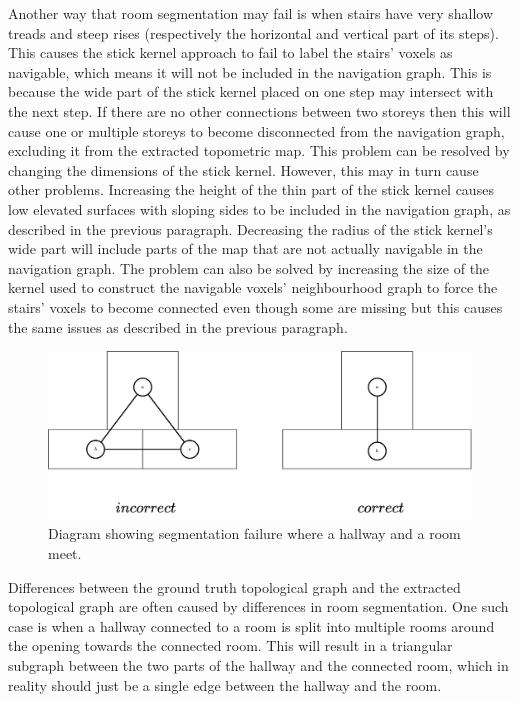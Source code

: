 Another way that room segmentation may fail is when stairs have very shallow treads and steep rises (respectively the horizontal and vertical part of its steps). This causes the stick kernel approach to fail to label the stairs' voxels as navigable, which means it will not be included in the navigation graph. This is because the wide part of the stick kernel placed on one step may intersect with the next step. If there are no other connections between two storeys then this will cause one or multiple storeys to become disconnected from the navigation graph, excluding it from the extracted topometric map. This problem can be resolved by changing the dimensions of the stick kernel. However, this may in turn cause other problems. Increasing the height of the thin part of the stick kernel causes low elevated surfaces with sloping sides to be included in the navigation graph, as described in the previous paragraph. Decreasing the radius of the stick kernel's wide part will include parts of the map that are not actually navigable in the navigation graph. The problem can also be solved by increasing the size of the kernel used to construct the navigable voxels' neighbourhood graph to force the stairs'  voxels to become connected even though some are missing but this causes the same issues as described in the previous paragraph.

\begin{figure}[h]
    \centering
    \includegraphics*[width=.8\textwidth]{./fig/segmentation_failure.drawio.pdf}
    \caption{Diagram showing segmentation failure where a hallway and a room meet.}
    \label{fig:seg_fail}
\end{figure}

Differences between the ground truth topological graph and the extracted topological graph are often caused by differences in room segmentation. One such case is when a hallway connected to a room is split into multiple rooms around the opening towards the connected room. This will result in a triangular subgraph between the two parts of the hallway and the connected room, which in reality should just be a single edge between the hallway and the room. 

